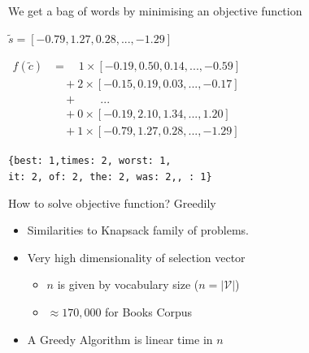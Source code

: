 \documentclass[]{beamer}
\renewcommand{\c}{\tilde{c}}
\newcommand{\st}{\tilde{s}}
\newcommand{\V}{\mathcal{V}}
\begin{document}
\begin{frame}{We get a bag of words by minimising an objective function}
	\vectorselectionproblemdefn
	\vfill
	\begin{description}
		\item<2->[Input Vector]  $\st=[−0.79, 1.27, 0.28, ..., −1.29]$
		\vfill
		\item<3->[Vector Selection] $\displaystyle
			\begin{aligned}%
			f(\c)&=\quad1\times[−0.19, 0.50, 0.14, ..., −0.59]\\
			&\quad+2\times[-0.15, 0.19, 0.03, ..., -0.17]\\
			&\quad+\qquad...\\
			&\quad+0\times[−0.19, 2.10, 1.34, ..., 1.20]\\
			&\quad+1\times[−0.79, 1.27, 0.28, ..., −1.29]
		\end{aligned}
		$
		\vfill
		\item<4->[BOW] \texttt{\{best: 1,times: 2, worst: 1, \\it: 2, of: 2, the: 2, was: 2,, : 1\}}
	\end{description}
\end{frame}

\begin{frame}{How to solve objective function? Greedily}
	\vectorselectionproblemdefn
		\vfill
	\begin{itemize}
		\item<1-> Similarities to \alert{Knapsack} family of problems.
		\item<2-> Very high dimensionality of selection vector\begin{itemize}
			\item $n$ is given by vocabulary size ($n=|\V|$)
			\item $\approx170,000$ for Books Corpus
			\end{itemize}
		\item<3-> A Greedy Algorithm is linear time in $n$ 
	\end{itemize}
	\vfill
\end{frame}
\end{document}
